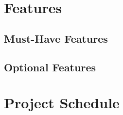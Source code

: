 \documentclass[dvips,12pt]{article}
\begin{document}
\section{Features}
\subsection{Must-Have Features}
\subsection{Optional Features}

\section{Project Schedule}
\end{document}
